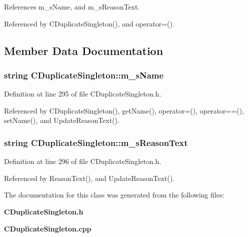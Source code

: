 References m\_\-s\-Name, and m\_\-s\-Reason\-Text.

Referenced by CDuplicate\-Singleton(), and operator=().

\subsection{Member Data Documentation}
\subsubsection{\setlength{\rightskip}{0pt plus 5cm}string CDuplicate\-Singleton::m\_\-s\-Name\hspace{0.3cm}{\tt  [private]}}\label{classCDuplicateSingleton_o0}




Definition at line 295 of file CDuplicate\-Singleton.h.

Referenced by CDuplicate\-Singleton(), get\-Name(), operator=(), operator==(), set\-Name(), and Update\-Reason\-Text().
\subsubsection{\setlength{\rightskip}{0pt plus 5cm}string CDuplicate\-Singleton::m\_\-s\-Reason\-Text\hspace{0.3cm}{\tt  [private]}}\label{classCDuplicateSingleton_o1}




Definition at line 296 of file CDuplicate\-Singleton.h.

Referenced by Reason\-Text(), and Update\-Reason\-Text().

The documentation for this class was generated from the following files:\begin{CompactItemize}
\item 
{\bf CDuplicate\-Singleton.h}\item 
{\bf CDuplicate\-Singleton.cpp}\end{CompactItemize}
